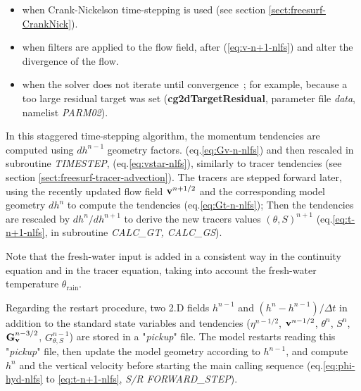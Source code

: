 \begin{itemize}
\item when Crank-Nickelson time-stepping is used (see section
\ref{sect:freesurf-CrankNick}).
\item when filters are applied to the flow field, after
(\ref{eq:v-n+1-nlfs}) and alter the divergence of the flow.
\item when the solver does not iterate until convergence~;
 for example, because a too large residual target was set
 ({\bf cg2dTargetResidual}, parameter file {\em data}, namelist
 {\em PARM02}).
\end{itemize}\noindent
In this staggered time-stepping algorithm, the momentum tendencies
are computed using $dh^{n-1}$ geometry factors.
(eq.\ref{eq:Gv-n-nlfs}) and then rescaled in subroutine {\it TIMESTEP},
(eq.\ref{eq:vstar-nlfs}), similarly to tracer tendencies (see section
\ref{sect:freesurf-tracer-advection}).
The tracers are stepped forward later, using the recently updated
flow field ${\bf v}^{n+1/2}$ and the corresponding model geometry
$dh^{n}$ to compute the tendencies (eq.\ref{eq:Gt-n-nlfs});
Then the tendencies are rescaled by $dh^n/dh^{n+1}$ to derive
the new tracers values $(\theta,S)^{n+1}$ (eq.\ref{eq:t-n+1-nlfs},
in subroutine {\em CALC\_GT, CALC\_GS}).

Note that the fresh-water input is added in a consistent way in the 
continuity equation and in the tracer equation, taking into account
the fresh-water temperature $\theta_{\mathrm{rain}}$.

Regarding the restart procedure,
two 2.D fields $h^{n-1}$ and $(h^n-h^{n-1})/\Delta t$ 
in addition to the standard
state variables and tendencies ($\eta^{n-1/2}$, ${\bf v}^{n-1/2}$,
$\theta^n$, $S^n$, ${\bf G}_{\bf v}^{n-3/2}$, $G_{\theta,S}^{n-1}$)
are stored in a "{\em pickup}" file.
The model restarts reading this "{\em pickup}" file,
then update the model geometry according to $h^{n-1}$,
and compute $h^n$ and the vertical velocity
before starting the main calling sequence (eq.\ref{eq:phi-hyd-nlfs} 
to \ref{eq:t-n+1-nlfs}, {\em S/R FORWARD\_STEP}).
\\


